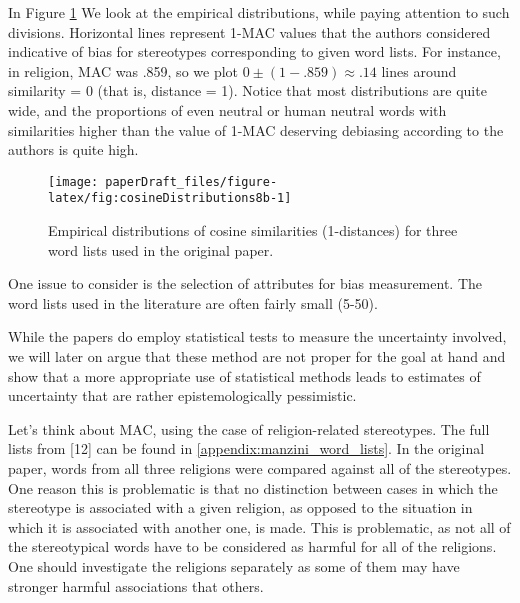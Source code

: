 \documentclass[
  10pt,
  dvipsnames,enabledeprecatedfontcommands]{scrartcl}
\begin{document}
In Figure \ref{fig:empirical} We look at the empirical distributions,
while paying attention to such divisions. Horizontal lines represent
1-MAC values that the authors considered indicative of bias for
stereotypes corresponding to given word lists. For instance, in
religion, MAC was .859, so we plot \(0\pm (1-.859)\approx .14\) lines
around similarity = 0 (that is, distance = 1). Notice that most
distributions are quite wide, and the proportions of even neutral or
human neutral words with similarities higher than the value of 1-MAC
deserving debiasing according to the authors is quite high.

\pagebreak

\begin{figure}[H]

\begin{center}\texttt{[image: paperDraft\_files/figure-latex/fig:cosineDistributions8b-1]} \end{center}

\caption{Empirical distributions of cosine similarities (1-distances) for three word lists used in  the original paper.  }

\label{fig:empirical}
\end{figure}

One issue to consider is the selection of attributes for bias
measurement. The word lists used in the literature are often fairly
small (5-50).

While the papers do employ statistical tests to measure the uncertainty
involved, we will later on argue that these method are not proper for
the goal at hand and show that a more appropriate use of statistical
methods leads to estimates of uncertainty that are rather
epistemologically pessimistic. 

Let's think about MAC, using the case of religion-related stereotypes.
The full lists from {[}12{]} can be found in
\ref{appendix:manzini_word_lists}. In the original paper, words from all
three religions were compared against all of the stereotypes. One reason
this is problematic is that no distinction between cases in which the
stereotype is associated with a given religion, as opposed to the
situation in which it is associated with another one, is made. This is
problematic, as not all of the stereotypical words have to be considered
as harmful for all of the religions. One should investigate the
religions separately as some of them may have stronger harmful
associations that others.
\end{document}

